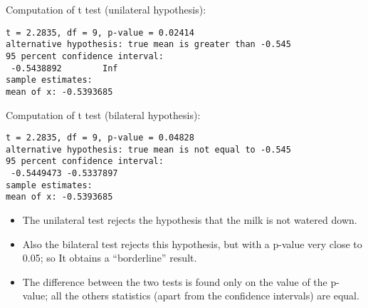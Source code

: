 \begin{frame}[fragile]
  Computation of t test (unilateral hypothesis):
  \begin{verbatim}
t = 2.2835, df = 9, p-value = 0.02414
alternative hypothesis: true mean is greater than -0.545
95 percent confidence interval:
 -0.5438892        Inf
sample estimates:
mean of x: -0.5393685
  \end{verbatim}
\end{frame}

\begin{frame}[fragile]
  Computation of t test (bilateral hypothesis):
  \begin{verbatim}
t = 2.2835, df = 9, p-value = 0.04828
alternative hypothesis: true mean is not equal to -0.545
95 percent confidence interval:
 -0.5449473 -0.5337897
sample estimates:
mean of x: -0.5393685
  \end{verbatim}
\end{frame}

\begin{frame}
  \begin{itemize}
    \item The unilateral test rejects the hypothesis that the milk is not watered down.
    \vspace{0.75cm}
    \item Also the bilateral test rejects this hypothesis, but with a p-value very close to 0.05; so It obtains a ``borderline'' result.
    \vspace{0.75cm}
    \item The difference between the two tests is found only on the value of the p-value; all the others statistics (apart from the confidence intervals) are equal.
  \end{itemize}
\end{frame}


